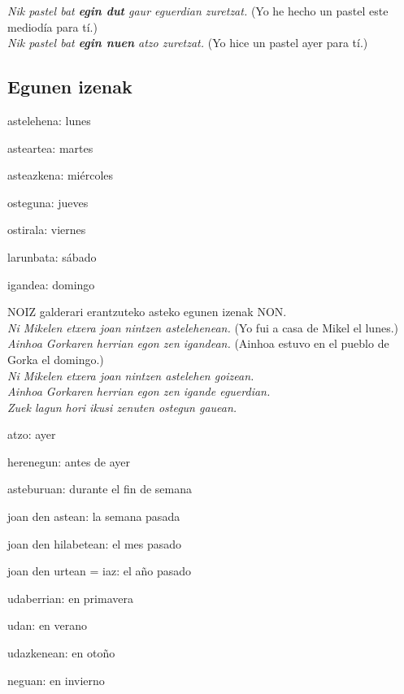 \documentclass[11pt, a4paper]{article}
\begin{document}
\indent \textit{Nik pastel bat \textbf{egin dut} gaur eguerdian zuretzat.}
(Yo he hecho un pastel este mediodía para tí.)\\
\indent \textit{Nik pastel bat \textbf{egin nuen} atzo zuretzat.}
(Yo hice un pastel ayer para tí.)\\

\subsection{Egunen izenak}
\begin{itemize}
\begin{multicols}{2}
\item astelehena: lunes
\item asteartea: martes
\item asteazkena: miércoles
\item osteguna: jueves
\item ostirala: viernes
\item larunbata: sábado
\item igandea: domingo
\end{multicols}
\end{itemize}

\noindent NOIZ galderari erantzuteko asteko egunen izenak NON.\\
\indent \textit{Ni Mikelen etxera joan nintzen astelehenean.}
(Yo fui a casa de Mikel el lunes.)\\
\indent \textit{Ainhoa Gorkaren herrian egon zen igandean.}
(Ainhoa estuvo en el pueblo de Gorka el domingo.)\\
\indent \textit{Ni Mikelen etxera joan nintzen astelehen goizean.}\\
\indent \textit{Ainhoa Gorkaren herrian egon zen igande eguerdian.}\\
\indent \textit{Zuek lagun hori ikusi zenuten ostegun gauean.}\\

\begin{itemize}
\begin{multicols}{2}
\item atzo: ayer
\item herenegun: antes de ayer
\item asteburuan: durante el fin de semana
\item joan den astean: la semana pasada
\item joan den hilabetean: el mes pasado
\item joan den urtean = iaz: el año pasado
\item udaberrian: en primavera
\item udan: en verano
\item udazkenean: en otoño
\item neguan: en invierno
\end{multicols}
\end{itemize}
\end{document}
